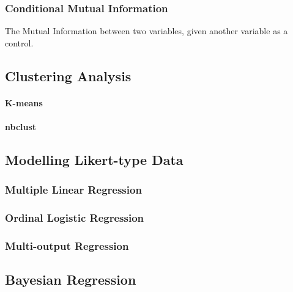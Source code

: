    \subsubsection{Conditional Mutual Information}
   The Mutual Information between two variables, given another variable as a control.


 \subsection{Clustering Analysis}
   \paragraph{K-means}
   \paragraph{nbclust}

 \subsection{Modelling Likert-type Data}

   \subsubsection{Multiple Linear Regression}

   \subsubsection{Ordinal Logistic Regression}

   \subsubsection{Multi-output Regression}


 \subsection{Bayesian Regression}
